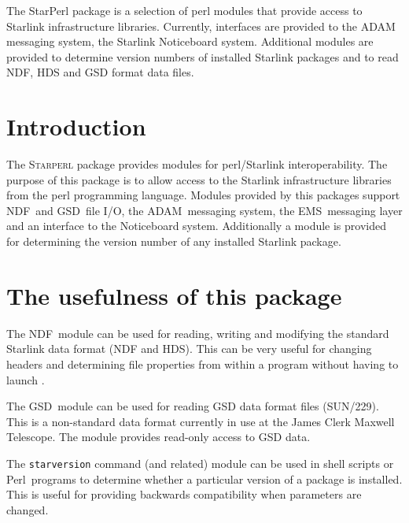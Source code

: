 \documentclass[twoside,11pt]{article}
\newcommand{\stardocinitials}  {SUN}
\newcommand{\stardocnumber}    {228.4}
\newcommand{\stardocabstract}  {The StarPerl package is a selection
of perl modules that provide access to Starlink infrastructure libraries.
Currently, interfaces are provided to the ADAM messaging system,
the Starlink Noticeboard system. Additional modules are provided to determine
version numbers of installed Starlink packages and to read NDF, HDS and
GSD format data files.
}
\newcommand{\Kappa}{\xref{{\sc{Kappa}}}{sun95}{}}
\newcommand{\ADAM}{\xref{{ADAM}}{sun144}{}}
\newcommand{\gsd}{\xref{{GSD}}{sun229}{}}
\newcommand{\ndf}{\xref{NDF}{sun33}{}}
\newcommand{\ems}{\xref{EMS}{ssn4}{}}
\newcommand{\perl}{\xref{\textsf{Perl}}{sun193}{}}
\newcommand{\stardocname}{\stardocinitials /\stardocnumber}
\newcommand{\htmladdnormallink}[2]{#1}
\newenvironment{latexonly}{}{}
\newcommand{\xref}[3]{#1}
\renewcommand{\_}{\texttt{\symbol{95}}}
\renewcommand{\thepage}{\roman{page}}
\begin{document}
\stardocabstract
  \newpage
  \begin{latexonly}
    \setlength{\parskip}{0mm}
    \tableofcontents
    \setlength{\parskip}{\medskipamount}
    \markboth{\stardocname}{\stardocname}
  \end{latexonly}
\cleardoublepage
\renewcommand{\thepage}{\arabic{page}}
\setcounter{page}{1}


\section{Introduction}

The \textsc{Starperl} package provides modules for perl/Starlink
interoperability. The purpose of this package is to allow access to the
Starlink infrastructure libraries from the \xref{perl}{sun193}{} programming
language. Modules provided by this packages support  \ndf\ and \gsd\ file I/O, 
the \ADAM\ messaging system, the \ems\ messaging layer  and an interface to
the Noticeboard system. Additionally a module is provided for determining the
version number of any installed Starlink package.

\section{The usefulness of this package\label{stats}}

The \ndf\ module can be used for reading, writing and modifying 
the standard Starlink data format (NDF and HDS). This can be
very useful for changing headers and determining file properties
from within a program without having to launch \Kappa.

The \gsd\ module can be used for reading GSD data format files (SUN/229). This
is a non-standard data format currently in use at the \htmladdnormallink{James
  Clerk Maxwell Telescope}{http://www.jach.hawaii.edu/JACpublic/JCMT}.  The
module provides read-only access to GSD data.

The \texttt{starversion} command (and related) module can be used in shell
scripts or \perl\ programs to determine whether a particular version of a
package is installed. This is useful for providing backwards compatibility
when parameters are changed.
\end{document}
